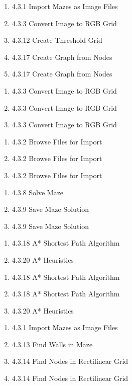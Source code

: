 \documentclass[titlepage]{article}
\begin{document}
\begin{enumerate} [{Obj 1.}1:]
\item 4.3.1 Import Mazes as Image Files
\item 4.3.3 Convert Image to RGB Grid
\item 4.3.12 Create Threshold Grid
\item 4.3.17 Create Graph from Nodes
\item 4.3.17 Create Graph from Nodes
\end{enumerate}
\begin{enumerate} [{Obj 2.}1:]
\item 4.3.3 Convert Image to RGB Grid
\item 4.3.3 Convert Image to RGB Grid
\item 4.3.3 Convert Image to RGB Grid
\end{enumerate}
\begin{enumerate} [{Obj 3.}1:]
\item 4.3.2 Browse Files for Import
\item 4.3.2 Browse Files for Import
\item 4.3.2 Browse Files for Import
\end{enumerate}
\begin{enumerate} [{Obj 4.}1:]
\item 4.3.8 Solve Maze
\item 4.3.9 Save Maze Solution 
\item 4.3.9 Save Maze Solution 
\end{enumerate}
\begin{enumerate} [{Obj 5.}1:]
\item 4.3.18 A* Shortest Path Algorithm
\item 4.3.20 A* Heuristics
\end{enumerate}
\begin{enumerate} [{Obj 6.}1:]
\item 4.3.18 A* Shortest Path Algorithm
\item 4.3.18 A* Shortest Path Algorithm
\item 4.3.20 A* Heuristics
\end{enumerate}
\begin{enumerate} [{Obj 7.}1:]
\item 4.3.1 Import Mazes as Image Files
\item 4.3.13 Find Walls in Maze
\item 4.3.14 Find Nodes in Rectilinear Grid
\item 4.3.14 Find Nodes in Rectilinear Grid
\end{enumerate}
\end{document}
